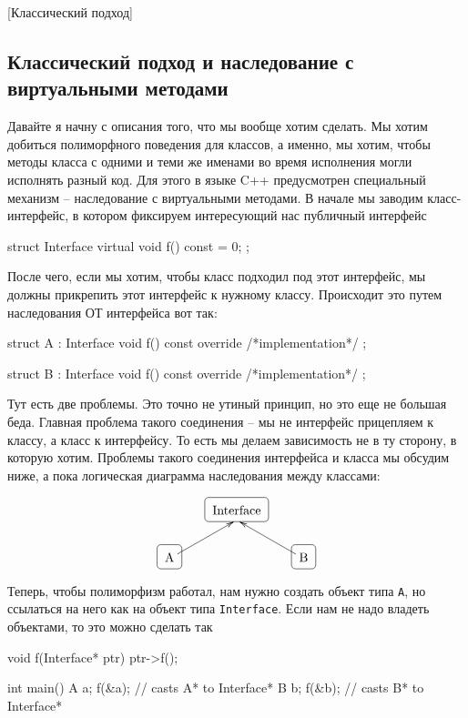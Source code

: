[Классический подход]


\subsection{Классический подход и наследование с виртуальными методами}
\label{section::ClassicPolymorphism}

Давайте я начну с описания того, что мы вообще хотим сделать.
Мы хотим добиться полиморфного поведения для классов, а именно, мы хотим, чтобы методы класса с одними и теми же именами во время исполнения могли исполнять разный код.
Для этого в языке C++ предусмотрен специальный механизм -- наследование с виртуальными методами.
В начале мы заводим класс-интерфейс, в котором фиксируем интересующий нас публичный интерфейс
\begin{cppcode}
struct Interface {
  virtual void f() const = 0;
};
\end{cppcode}
После чего, если мы хотим, чтобы класс подходил под этот интерфейс, мы должны прикрепить этот интерфейс к нужному классу.
Происходит это путем наследования ОТ интерфейса вот так:
\begin{cppcode}
struct A : Interface {
  void f() const override { /*implementation*/ }
};

struct B : Interface {
  void f() const override { /*implementation*/ }
};
\end{cppcode}
Тут есть две проблемы.
Это точно не утиный принцип, но это еще не большая беда.
Главная проблема такого соединения -- мы не интерфейс прицепляем к классу, а класс к интерфейсу.
То есть мы делаем зависимость не в ту сторону, в которую хотим.
Проблемы такого соединения интерфейса и класса мы обсудим ниже, а пока логическая диаграмма наследования между классами:
\begin{center}
\[
\xymatrix{
  {}&{\text{Interface}}
   	{\save
   [].[]*+[F-:<3pt>]\frm{}
   \restore
	}
  &{}\\
  {\text{A}}\ar[ur]+(-1, -3)
 	{\save
   [].[]*+[F-:<3pt>]\frm{}
   \restore
	}
  &{}&{\text{B}}\ar[ul]+(1, -3)
   {	\save
   [].[]*+[F-:<3pt>]\frm{}
   \restore
	}
}
\]
\end{center}
Теперь, чтобы полиморфизм работал, нам нужно создать объект типа \texttt{A}, но ссылаться на него как на объект типа \texttt{Interface}.
Если нам не надо владеть объектами, то это можно сделать так
\begin{cppcode}
void f(Interface* ptr) {
  ptr->f();
}

int main() {
  A a;
  f(&a); // casts A* to Interface*
  B b;
  f(&b); // casts B* to Interface*
}
\end{cppcode}
